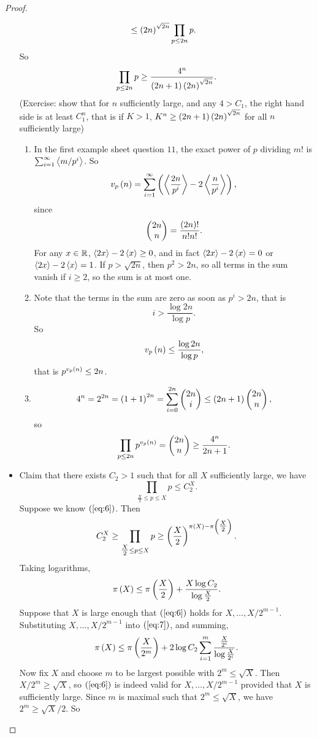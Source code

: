 \begin{proof}
\begin{itemize}
\begin{align*}
& \le \left( 2n \right)^{\sqrt{2n}} \prod_{p \le 2n} p.
\end{align*}
So
$$ \prod_{p \le 2n} p \ge \dfrac{4^n}{\left( 2n + 1 \right)\left( 2n \right)^{\sqrt{2n}}}. $$
(Exercise: show that for $ n $ sufficiently large, and any $ 4 > C_1 $, the right hand side is at least $ C_1^n $, that is if $ K > 1 $, $ K^n \ge \left( 2n + 1 \right)\left( 2n \right)^{\sqrt{2n}} $ for all $ n $ sufficiently large)
\begin{enumerate}
\item In the first example sheet question $ 11 $, the exact power of $ p $ dividing $ m! $ is $ \sum_{i = 1}^\infty \left\langle m / p^i \right\rangle $. So
$$ v_p\left( n \right) = \sum_{i = 1}^\infty \left( \left\langle \dfrac{2n}{p^i} \right\rangle - 2\left\langle \dfrac{n}{p^i} \right\rangle \right), $$
since
$$ \begin{pmatrix} 2n \\ n \end{pmatrix} = \dfrac{\left( 2n \right)!}{n!n!}. $$
For any $ x \in \mathbb{R} $, $ \left\langle 2x \right\rangle - 2\left\langle x \right\rangle \ge 0 $, and in fact $ \left\langle 2x \right\rangle - 2\left\langle x \right\rangle = 0 $ or $ \left\langle 2x \right\rangle - 2\left\langle x \right\rangle = 1 $. If $ p > \sqrt{2n} $, then $ p^2 > 2n $, so all terms in the sum vanish if $ i \ge 2 $, so the sum is at most one.
\item Note that the terms in the sum are zero as soon as $ p^i > 2n $, that is
$$ i > \dfrac{\log 2n}{\log p}. $$
So
$$ v_p\left( n \right) \le \dfrac{\log 2n}{\log p}, $$
that is $ p^{v_p\left( n \right)} \le 2n $.
\item
$$ 4^n = 2^{2n} = \left( 1 + 1 \right)^{2n} = \sum_{i = 0}^{2n} \begin{pmatrix} 2n \\ i \end{pmatrix} \le \left( 2n + 1 \right)\begin{pmatrix} 2n \\ n \end{pmatrix}, $$
so
$$ \prod_{p \le 2n} p^{v_p\left( n \right)} = \begin{pmatrix} 2n \\ n \end{pmatrix} \ge \dfrac{4^n}{2n + 1}. $$
\end{enumerate}
\item Claim that there exists $ C_2 > 1 $ such that for all $ X $ sufficiently large, we have
\begin{equation}
\label{eq:6}
\prod_{\tfrac{X}{2} \le p \le X} p \le C_2^X.
\end{equation}
Suppose we know $ \left( \ref{eq:6} \right) $. Then
$$ C_2^X \ge \prod_{\tfrac{X}{2} \le p \le X} p \ge \left( \dfrac{X}{2} \right)^{\pi\left( X \right) - \pi\left( \tfrac{X}{2} \right)}. $$
Taking logarithms,
\begin{equation}
\label{eq:7}
\pi\left( X \right) \le \pi\left( \dfrac{X}{2} \right) + \dfrac{X\log C_2}{\log \tfrac{X}{2}}.
\end{equation}
Suppose that $ X $ is large enough that $ \left( \ref{eq:6} \right) $ holds for $ X, \dots, X / 2^{m - 1} $. Substituting $ X, \dots, X / 2^{m - 1} $ into $ \left( \ref{eq:7} \right) $, and summing,
$$ \pi\left( X \right) \le \pi\left( \dfrac{X}{2^m} \right) + 2\log C_2\sum_{i = 1}^m \dfrac{\tfrac{X}{2^i}}{\log \tfrac{X}{2^i}}. $$
Now fix $ X $ and choose $ m $ to be largest possible with $ 2^m \le \sqrt{X} $. Then $ X / 2^m \ge \sqrt{X} $, so $ \left( \ref{eq:6} \right) $ is indeed valid for $ X, \dots, X / 2^{m - 1} $ provided that $ X $ is sufficiently large. Since $ m $ is maximal such that $ 2^m \le \sqrt{X} $, we have $ 2^m \ge \sqrt{X} / 2 $. So

\end{itemize}
\end{proof}

